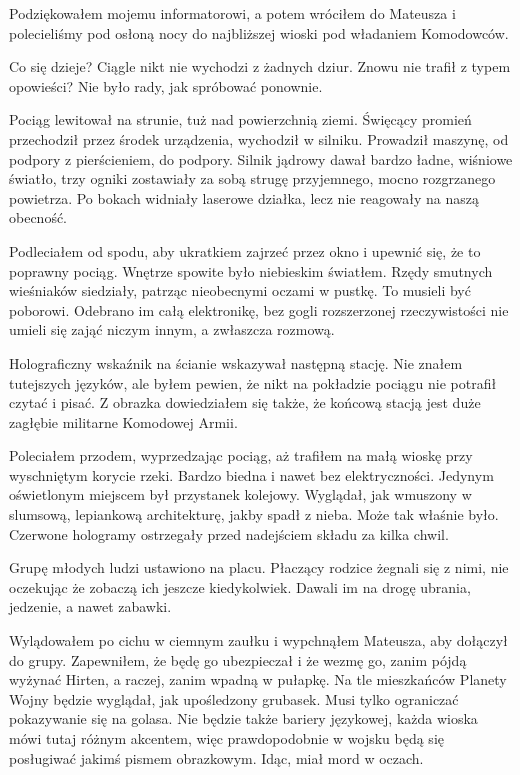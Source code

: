 Podziękowałem mojemu informatorowi, a potem wróciłem do Mateusza i polecieliśmy pod osłoną nocy do najbliższej wioski pod władaniem Komodowców.

\divider{}

Co się dzieje? 
Ciągle nikt nie wychodzi z żadnych dziur.
Znowu nie trafił z typem opowieści?
Nie było rady, jak spróbować ponownie.

\divider{}

Pociąg lewitował na strunie, tuż nad powierzchnią ziemi.
Święcący promień przechodził przez środek urządzenia, wychodził w silniku.
Prowadził maszynę, od podpory z pierścieniem, do podpory.
Silnik jądrowy dawał bardzo ładne, wiśniowe światło, trzy ogniki zostawiały za sobą strugę przyjemnego, mocno rozgrzanego powietrza.
Po bokach widniały laserowe działka, lecz nie reagowały na naszą obecność.

Podleciałem od spodu, aby ukratkiem zajrzeć przez okno i upewnić się, że to poprawny pociąg.
Wnętrze spowite było niebieskim światłem.
Rzędy smutnych wieśniaków siedziały, patrząc nieobecnymi oczami w pustkę.
To musieli być poborowi.
Odebrano im całą elektronikę, bez gogli rozszerzonej rzeczywistości nie umieli się zająć niczym innym, a zwłaszcza rozmową.

Holograficzny wskaźnik na ścianie wskazywał następną stację.
Nie znałem tutejszych języków, ale byłem pewien, że nikt na pokładzie pociągu nie potrafił czytać i pisać.
Z obrazka dowiedziałem się także, że końcową stacją jest duże zagłębie militarne Komodowej Armii.

Poleciałem przodem, wyprzedzając pociąg, aż trafiłem na małą wioskę przy wyschniętym korycie rzeki.
Bardzo biedna i nawet bez elektryczności.
Jedynym oświetlonym miejscem był przystanek kolejowy.
Wyglądał, jak wmuszony w slumsową, lepiankową architekturę, jakby spadł z nieba. Może tak właśnie było.
Czerwone hologramy ostrzegały przed nadejściem składu za kilka chwil.

Grupę młodych ludzi ustawiono na placu.
Płaczący rodzice żegnali się z nimi, nie oczekując że zobaczą ich jeszcze kiedykolwiek.
Dawali im na drogę ubrania, jedzenie, a nawet zabawki.

Wylądowałem po cichu w ciemnym zaułku i wypchnąłem Mateusza, aby dołączył do grupy.
Zapewniłem, że będę go ubezpieczał i że wezmę go, zanim pójdą wyżynać Hirten, a raczej, zanim wpadną w pułapkę.
Na tle mieszkańców Planety Wojny będzie wyglądał, jak upośledzony grubasek. Musi tylko ograniczać pokazywanie się na golasa.
Nie będzie także bariery językowej, każda wioska mówi tutaj różnym akcentem, więc prawdopodobnie w wojsku będą się posługiwać jakimś pismem obrazkowym.
Idąc, miał mord w oczach.

